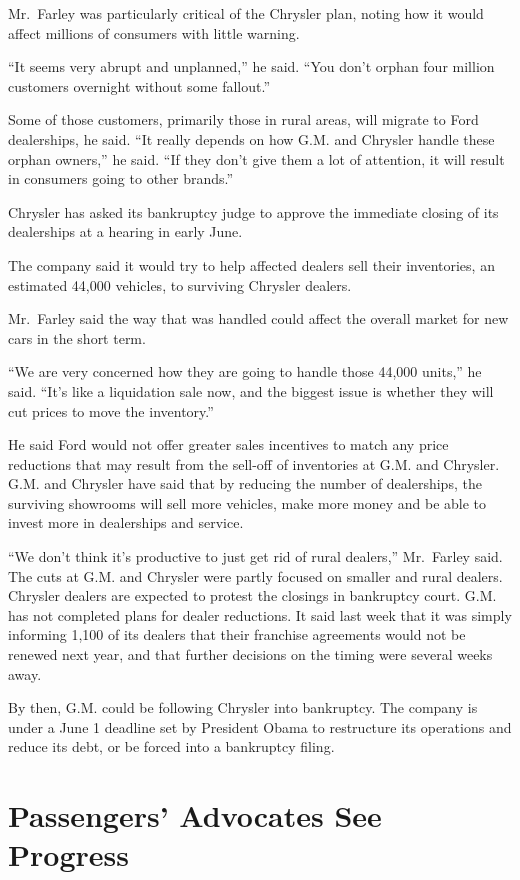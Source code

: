 \documentclass[12pt,a4paper,onecolumn]{article}
\begin{document}
Mr.~Farley was particularly critical of the Chrysler plan, noting how it would affect millions of
consumers with little warning.

``It seems very abrupt and unplanned,'' he said. ``You don't orphan four million customers overnight
without some fallout.''

Some of those customers, primarily those in rural areas, will migrate to Ford dealerships, he said.
``It really depends on how G.M. and Chrysler handle these orphan owners,'' he said. ``If they don't
give them a lot of attention, it will result in consumers going to other brands.''

Chrysler has asked its bankruptcy judge to approve the immediate closing of its dealerships at a
hearing in early June.

The company said it would try to help affected dealers sell their inventories, an estimated 44,000
vehicles, to surviving Chrysler dealers.

Mr.~Farley said the way that was handled could affect the overall market for new cars in the short
term.

``We are very concerned how they are going to handle those 44,000 units,'' he said. ``It's like a
liquidation sale now, and the biggest issue is whether they will cut prices to move the inventory.''

He said Ford would not offer greater sales incentives to match any price reductions that may result
from the sell-off of inventories at G.M. and Chrysler. G.M. and Chrysler have said that by reducing
the number of dealerships, the surviving showrooms will sell more vehicles, make more money and be
able to invest more in dealerships and service.

``We don't think it's productive to just get rid of rural dealers,'' Mr.~Farley said. The cuts at G.M. and Chrysler were partly focused on smaller and rural dealers. Chrysler dealers are expected to protest the closings in bankruptcy court. G.M. has not completed plans for dealer reductions. It said last week that it was simply informing 1,100 of its dealers that their franchise agreements would not be renewed next year, and that further decisions on the timing were several weeks away.

By then, G.M. could be following Chrysler into bankruptcy. The company is under a June 1 deadline set by President Obama to restructure its operations and reduce its debt, or be forced into a bankruptcy filing.

\section{Passengers' Advocates See Progress}
\end{document}
